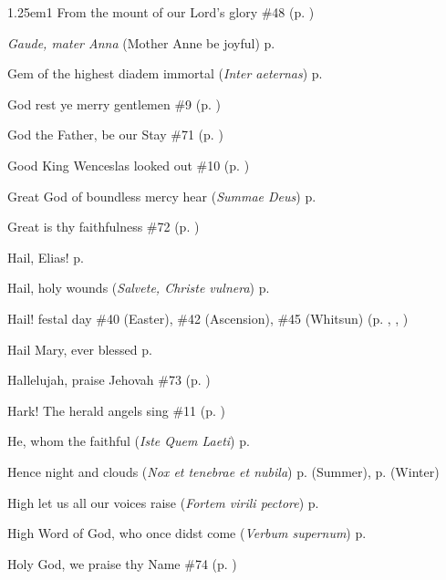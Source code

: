 \begin{hangparas}{1.25em}{1}
From the mount of our Lord's glory \dotfill \#48 (p. \pageref{Hymn48})
\par\noindent
\textit{Gaude, mater Anna} (Mother Anne be joyful) \dotfill p. \pageref{AnneIEvensong}
\par\noindent
Gem of the highest diadem immortal (\textit{Inter aeternas}) \dotfill p. \pageref{BenedictMattins}
\par\noindent
God rest ye merry gentlemen \dotfill \#9 (p. \pageref{Hymn9})
\par\noindent
God the Father, be our Stay \dotfill \#71 (p. \pageref{Hymn71})
\par\noindent
Good King Wenceslas looked out \dotfill \#10 (p. \pageref{Hymn10})
\par\noindent
Great God of boundless mercy hear (\textit{Summae Deus}) \dotfill p. \pageref{SaturdayInvitatory}
\par\noindent
Great is thy faithfulness \dotfill \#72 (p. \pageref{Hymn72})
\par\noindent
Hail, Elias! \dotfill p. \pageref{EliasMattins}
\par\noindent
Hail, holy wounds (\textit{Salvete, Christe vulnera}) \dotfill p. \pageref{PreciousBloodMattins}
\par\noindent
Hail! festal day \dotfill \#40 (Easter), \#42 (Ascension), \#45 (Whitsun) (p. \pageref{Hymn40}, \pageref{Hymn42}, \pageref{Hymn45})
\par\noindent
Hail Mary, ever blessed \dotfill p. \pageref{WalsinghamEvensong}
\par\noindent
Hallelujah, praise Jehovah \dotfill \#73 (p. \pageref{Hymn73})
\par\noindent
Hark! The herald angels sing \dotfill \#11 (p. \pageref{Hymn11})
\par\noindent
He, whom the faithful (\textit{Iste Quem Laeti}) \dotfill p. \pageref{JosephMattins}
\par\noindent
Hence night and clouds (\textit{Nox et tenebrae et nubila}) \dotfill p. \pageref{WednesdayMattinsSummer} (Summer), p. \pageref{WednesdayMattinsWinter} (Winter)
\par\noindent
High let us all our voices raise (\textit{Fortem virili pectore}) \dotfill p. \pageref{MartyressNotVirginMattins}
\par\noindent
High Word of God, who once didst come (\textit{Verbum supernum}) \dotfill p. \pageref{FirstAdventInvitatory}
\par\noindent
Holy God, we praise thy Name \dotfill \#74 (p. \pageref{Hymn74})
\par\noindent

\end{hangparas}
